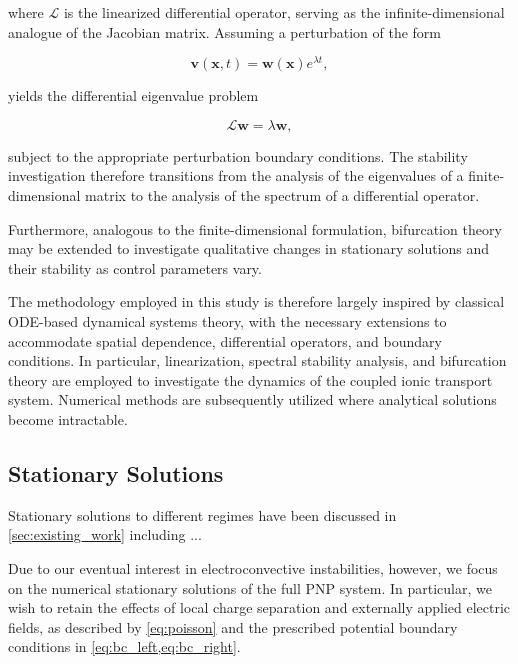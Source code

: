 \documentclass[11pt]{article}
\begin{document}
where $\mathcal{L}$ is the linearized differential
operator, serving as the infinite-dimensional
analogue of the Jacobian matrix. Assuming a
perturbation of the form

\begin{equation}
    \bm{v}(\bm{x},t)
    =\bm{w}(\bm{x})e^{\lambda t},
\end{equation}

yields the differential eigenvalue problem

\begin{equation}
    \mathcal{L}\bm{w}=\lambda\bm{w},
\end{equation}

subject to the appropriate perturbation boundary
conditions. The stability investigation therefore
transitions from the analysis of the eigenvalues
of a finite-dimensional matrix to the analysis
of the spectrum of a differential operator.

Furthermore, analogous to the finite-dimensional
formulation, bifurcation theory may be extended
to investigate qualitative changes in stationary
solutions and their stability as control parameters
vary.

The methodology employed in this study is therefore
largely inspired by classical ODE-based dynamical
systems theory, with the necessary extensions to
accommodate spatial dependence, differential
operators, and boundary conditions. In particular,
linearization, spectral stability analysis, and
bifurcation theory are employed to investigate
the dynamics of the coupled ionic transport system.
Numerical methods are subsequently utilized where
analytical solutions become intractable.


\subsection{Stationary Solutions}
Stationary solutions to different regimes have been 
discussed in \autoref{sec:existing_work} including ...


Due to our eventual interest in electroconvective
instabilities, however, we focus on the numerical
stationary solutions of the full PNP system.
In particular, we wish to retain the effects of
local charge separation and externally applied
electric fields, as described by
\eqref{eq:poisson} and the prescribed potential
boundary conditions in \cref{eq:bc_left,eq:bc_right}.
\end{document}
